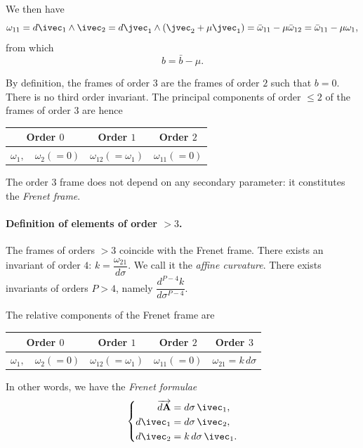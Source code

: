 We then have
\[
\omega_{11}=d\ivec_{1}\wedge\ivec_{2}=d\jvec_{1}\wedge(\jvec_{2}+\mu\jvec_{1})=\bar\omega_{11}-\mu\bar\omega_{12}=\bar\omega_{11}-\mu\omega_{1},
\]
from which
\[
b=\bar b-\mu.
\]

By definition, the frames of order $3$ are the frames of order $2$ such that $b=0$. There is no third order invariant. The principal components of order $\le 2$ of the frames of order $3$ are hence
 \begin{center}  
\begin{tabular}{|c|c|c|}
  \hline
  Order $0$&Order $1$&Order $2$\\
  \hline
  $\omega_{1},\quad\omega_{2}(=0)$&$\omega_{12}(=\omega_{1})$&$\omega_{11}(=0)$\\
  \hline
\end{tabular}
\end{center}

The order $3$ frame does not depend on any secondary parameter: it constitutes the \emph{Frenet frame}.


\paragraph{Definition of elements of order $>3$.}
\label{sec:137}
The frames of orders $>3$ coincide with the Frenet frame. There exists an invariant of order $4$: $k=\dfrac{\omega_{21}}{d\sigma}$. We call it the \emph{affine curvature}. There exists invariants of orders $P>4$, namely $\dfrac{d^{P-4}k}{d\sigma^{P-4}}$.

The relative components of the Frenet frame are
 \begin{center}  
\begin{tabular}{|c|c|c|c|}
  \hline
  Order $0$&Order $1$&Order $2$&Order $3$\\
  \hline
  $\omega_{1},\quad\omega_{2}(=0)$&$\omega_{12}(=\omega_{1})$&$\omega_{11}(=0)$&$\omega_{21}=k\,d\sigma$\\
  \hline
\end{tabular}
\end{center}

In other words, we have the \emph{Frenet formulae}
\begin{equation}
  \label{eq:10.2.8}
  \left\{
    \begin{aligned}
      \overrightarrow{d\mathbf{A}}&=d\sigma\,\ivec_{1},\\
      d\ivec_{1}&=d\sigma\,\ivec_{2},\\
      d\ivec_{2}&=k\,d\sigma\,\ivec_{1}.
    \end{aligned}
  \right.
\end{equation}

